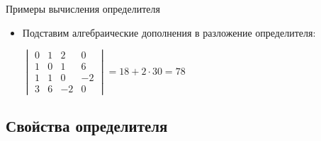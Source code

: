 \documentclass[unicode,11pt,notheorems]{beamer}
\begin{document}
\begin{frame}{Примеры вычисления определителя}
\begin{itemize}
\begin{itemize}
		\hfill$= {\color{vgured} 0-0+36}  {\color{vgublue}{} -18+12-0} = 30$
		
		\bigskip
		\item[$\bullet$] Подставим алгебраические дополнения в разложение определителя:
		
			$\begin{vmatrix}
				0 & 1 & 2  & 0  \\
				1 & 0 & 1  & 6  \\
				1 & 1 & 0  & -2 \\
				3 & 6 & -2 & 0
			\end{vmatrix} = 18+2\cdot 30 =78
			$
		\end{itemize}
	
\end{itemize}
\end{frame}
\subsection{Свойства определителя}
\end{document}
